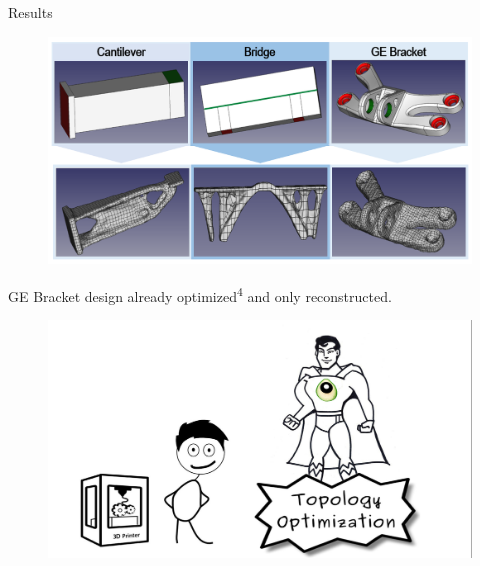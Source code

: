 \begin{frame}{Results}
\begin{figure}
		\includegraphics[width=1\linewidth]{Pictures/SecondHalf/TestCases.png}
		\end{figure}
GE Bracket design already optimized\textsuperscript{4} and only reconstructed.
\end{frame}
\begin{frame}
\begin{figure}

\vspace{-.7cm}	
\hspace{-2cm}		\includegraphics[width=1.2\linewidth]{Pictures/animations/animation_10.png}
		\end{figure}

\end{frame}






